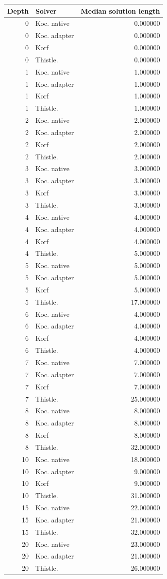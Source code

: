 \begin{tabular}{rp{}r}
\hline
Depth & Solver & Median solution length \\
\hline
0 & Koc. native & 0.000000 \\
0 & Koc. adapter & 0.000000 \\
0 & Korf & 0.000000 \\
0 & Thistle. & 0.000000 \\
1 & Koc. native & 1.000000 \\
1 & Koc. adapter & 1.000000 \\
1 & Korf & 1.000000 \\
1 & Thistle. & 1.000000 \\
2 & Koc. native & 2.000000 \\
2 & Koc. adapter & 2.000000 \\
2 & Korf & 2.000000 \\
2 & Thistle. & 2.000000 \\
3 & Koc. native & 3.000000 \\
3 & Koc. adapter & 3.000000 \\
3 & Korf & 3.000000 \\
3 & Thistle. & 3.000000 \\
4 & Koc. native & 4.000000 \\
4 & Koc. adapter & 4.000000 \\
4 & Korf & 4.000000 \\
4 & Thistle. & 5.000000 \\
5 & Koc. native & 5.000000 \\
5 & Koc. adapter & 5.000000 \\
5 & Korf & 5.000000 \\
5 & Thistle. & 17.000000 \\
6 & Koc. native & 4.000000 \\
6 & Koc. adapter & 4.000000 \\
6 & Korf & 4.000000 \\
6 & Thistle. & 4.000000 \\
7 & Koc. native & 7.000000 \\
7 & Koc. adapter & 7.000000 \\
7 & Korf & 7.000000 \\
7 & Thistle. & 25.000000 \\
8 & Koc. native & 8.000000 \\
8 & Koc. adapter & 8.000000 \\
8 & Korf & 8.000000 \\
8 & Thistle. & 32.000000 \\
10 & Koc. native & 18.000000 \\
10 & Koc. adapter & 9.000000 \\
10 & Korf & 9.000000 \\
10 & Thistle. & 31.000000 \\
15 & Koc. native & 22.000000 \\
15 & Koc. adapter & 21.000000 \\
15 & Thistle. & 32.000000 \\
20 & Koc. native & 23.000000 \\
20 & Koc. adapter & 21.000000 \\
20 & Thistle. & 26.000000 \\
\hline
\end{tabular}
